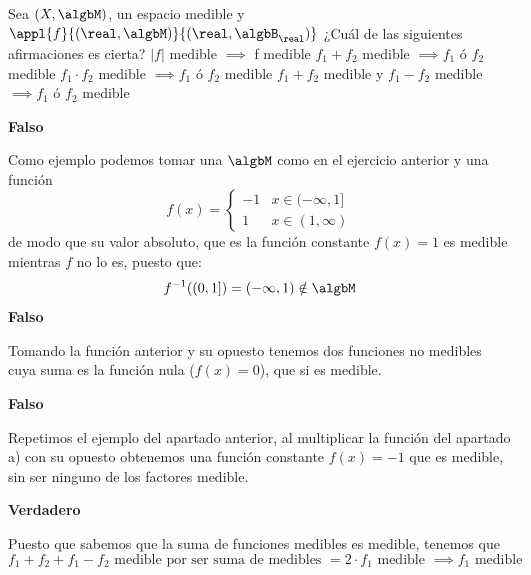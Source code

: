 \begin{problem}[2]
Sea $(X,\algbM)$, un espacio medible y $\appl{f}{(\real,\algbM)}{(\real, \algbB_{\real})}$ ¿Cuál de las siguientes afirmaciones es cierta?
\ppart $|f|$ medible $\implies$ f medible
\ppart $f_1+f_2$ medible $\implies f_1$ ó $f_2$ medible
\ppart $f_1\cdot f_2$ medible $\implies f_1$ ó $f_2$ medible
\ppart $f_1+f_2$ medible y $f_1-f_2$ medible $\implies f_1$ ó $f_2$ medible
\solution

\spart
\textbf{Falso}

Como ejemplo podemos tomar una $\algbM$ como en el ejercicio anterior y una función
\[ f(x)=  \begin{cases}
    -1 & x \in  (-\infty, 1] \\
    1 & x \in (1, \infty)
\end{cases} \]
de modo que su valor absoluto, que es la función constante $f(x)=1$ es medible mientras $f$ no lo es, puesto que:
\[f^{-1}((0,1]) = (-\infty, 1) \notin \algbM \]
\spart
\textbf{Falso}

Tomando la función anterior y su opuesto tenemos dos funciones no medibles cuya suma es la función nula ($f(x)=0$), que si es medible.

\spart
\textbf{Falso}

Repetimos el ejemplo del apartado anterior, al multiplicar la función del apartado a) con su opuesto obtenemos una función constante $f(x)=-1$ que es medible, sin ser ninguno de los factores medible.

\spart
\textbf{Verdadero}

Puesto que sabemos que la suma de funciones medibles es medible, tenemos que
\[f_1 + f_2 + f_1 -f_2 \text{ medible por ser suma de medibles } = 2\cdot f_1 \text{ medible } \implies f_1 \text{ medible}\]

\end{problem}


